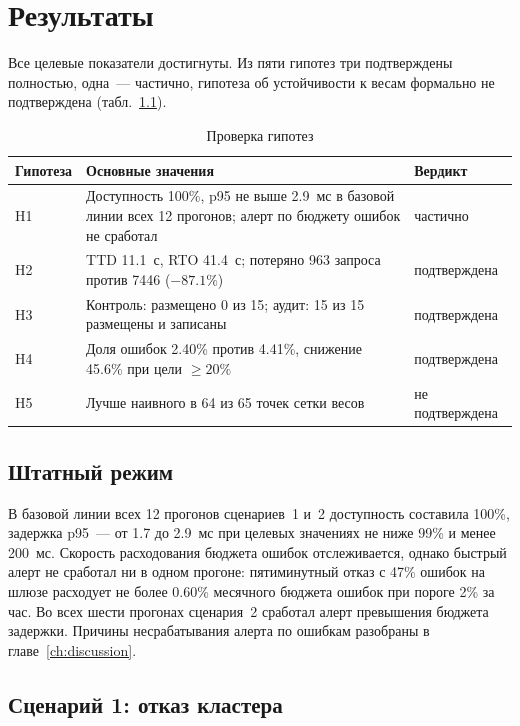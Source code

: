 \chapter{Результаты}

Все целевые показатели достигнуты. Из пяти гипотез три подтверждены
полностью, одна~--- частично, гипотеза об устойчивости к весам формально не
подтверждена (табл.~\ref{tab:hypotheses}).

\begin{table}[ht]
  \centering
  \caption{Проверка гипотез}
  \label{tab:hypotheses}
  \small
  \begin{tabularx}{\textwidth}{@{}lXl@{}}
    \toprule
    Гипотеза & Основные значения & Вердикт \\
    \midrule
    H1 & Доступность 100\%, p95 не выше 2.9~мс в базовой линии всех 12
      прогонов; алерт по бюджету ошибок не сработал & частично \\
    H2 & TTD 11.1~с, RTO 41.4~с; потеряно 963 запроса против 7446 ($-87.1\%$)
      & подтверждена \\
    H3 & Контроль: размещено 0 из 15; аудит: 15 из 15 размещены и записаны
      & подтверждена \\
    H4 & Доля ошибок 2.40\% против 4.41\%, снижение 45.6\% при цели
      $\ge 20\%$ & подтверждена \\
    H5 & Лучше наивного в 64 из 65 точек сетки весов & не подтверждена \\
    \bottomrule
  \end{tabularx}
\end{table}

\section{Штатный режим}

В базовой линии всех 12 прогонов сценариев~1 и~2 доступность составила
100\%, задержка p95~--- от 1.7 до 2.9~мс при целевых значениях не ниже 99\% и
менее 200~мс. Скорость расходования бюджета ошибок отслеживается, однако
быстрый алерт не сработал ни в одном прогоне: пятиминутный отказ с 47\%
ошибок на шлюзе расходует не более 0.60\% месячного бюджета ошибок при
пороге 2\% за час. Во всех шести прогонах сценария~2 сработал алерт
превышения бюджета задержки. Причины несрабатывания алерта по ошибкам
разобраны в главе~\ref{ch:discussion}.

\section{Сценарий 1: отказ кластера}

